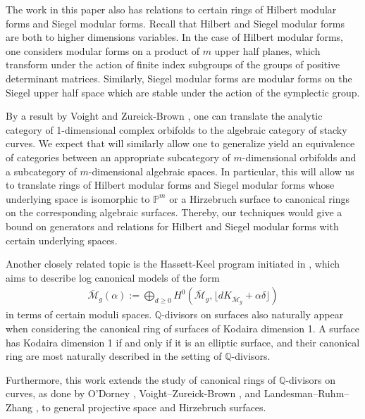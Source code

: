 \documentclass{amsart}
\theoremstyle{plain}
\theoremstyle{definition}
\theoremstyle{remark}
\numberwithin{equation}{section}
\newcommand\bq{{\mathbb Q}}
\newcommand\bp{{\mathbb P}}
\begin{document}
The work in this paper also has relations to certain rings of Hilbert 
modular forms and Siegel modular forms. Recall that Hilbert and Siegel 
modular forms are both to higher dimensions variables. In the case of 
Hilbert modular forms, one considers modular forms on a product of $m$
upper half planes, which transform under the action of finite index 
subgroups of the groups of positive determinant matrices. Similarly, Siegel 
modular forms are modular forms on the Siegel upper half space which are 
stable under the action of the symplectic group. 

By a result by Voight and Zureick-Brown \cite[Proposition 6.1.5]{vzb:stacky}, one can translate the analytic category of 1-dimensional complex orbifolds to the algebraic category of stacky curves. 
We expect that  will similarly allow one to generalize yield an equivalence of categories between an appropriate subcategory of $m$-dimensional orbifolds and a subcategory of $m$-dimensional algebraic spaces.
In particular, this will allow us to translate rings of Hilbert modular forms and Siegel modular forms whose underlying space is isomorphic to $\bp^m$ or a Hirzebruch surface to canonical rings on the corresponding algebraic surfaces. Thereby, our techniques would give a bound on generators and relations for Hilbert and Siegel modular forms with certain underlying spaces.

Another closely related topic is the Hassett-Keel program 
initiated in  \cite{hassett:classical-and-minimal-models}, which aims to describe log canonical models of the form
\begin{align*}
	\overline {\mathscr M}_g(\alpha) := \bigoplus_{d \geq 0}H^0 \left( \overline {\mathscr M}_g, \lfloor d K_{\overline{\mathscr M}_g} + \alpha\delta \rfloor  \right) 
\end{align*}
in terms of certain moduli spaces. $\bq$-divisors on surfaces also naturally appear when considering the canonical ring of surfaces of Kodaira dimension 1. A surface has Kodaira dimension 1 if and only if it is an elliptic surface, and their canonical ring are most naturally described in the setting of $\bq$-divisors. 

Furthermore, this work extends the study of canonical rings of
$\bq$-divisors on curves, as done by O'Dorney \cite{dorney:canonical},
Voight--Zureick-Brown \cite{vzb:stacky}, and Landesman--Ruhm--Zhang
\cite{lrz:spin-cring}, to general projective space and Hirzebruch
surfaces.
\end{document}
